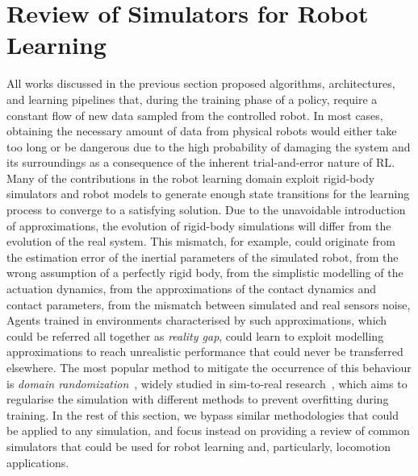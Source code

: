 \section{Review of Simulators for Robot Learning}
\label{sec:review_simulators_robot_learning}

All works discussed in the previous section proposed algorithms, architectures, and learning pipelines that, during the training phase of a policy, require a constant flow of new data sampled from the controlled robot.
In most cases, obtaining the necessary amount of data from physical robots would either take too long or be dangerous due to the high probability of damaging the system and its surroundings as a consequence of the inherent trial-and-error nature of \ac{RL}.
Many of the contributions in the robot learning domain exploit rigid-body simulators and robot models to generate enough state transitions for the learning process to converge to a satisfying solution.
Due to the unavoidable introduction of approximations, the evolution of rigid-body simulations will differ from the evolution of the real system.
This mismatch, for example, could originate from the estimation error of the inertial parameters of the simulated robot, from the wrong assumption of a perfectly rigid body, from the simplistic modelling of the actuation dynamics, from the approximations of the contact dynamics and contact parameters, from the mismatch between simulated and real sensors noise, \etc
Agents trained in environments characterised by such approximations, which could be referred all together as \emph{reality gap}, could learn to exploit modelling approximations to reach unrealistic performance that could never be transferred elsewhere.
The most popular method to mitigate the occurrence of this behaviour is \emph{domain randomization}~\parencite{peng_sim--real_2018, muratore_robot_2022}, widely studied in sim-to-real research~\parencite{zhao_sim--real_2020}, which aims to regularise the simulation with different methods to prevent overfitting during training.
In the rest of this section, we bypass similar methodologies that could be applied to any simulation, and focus instead on providing a review of common simulators that could be used for robot learning and, particularly, locomotion applications.

